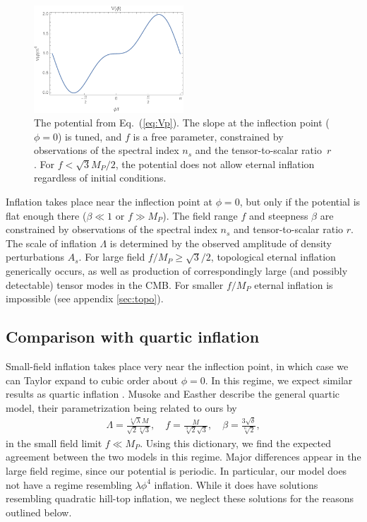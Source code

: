 \documentclass[aps,amsfonts,amsmath,prd,preprint,nofootinbib]{revtex4}
\newcommand{\Mp}{{M_{P}}}
\begin{document}
\begin{figure}[!h]
  \centering
    \includegraphics[width=0.5\textwidth]{figures/V.pdf}
    \caption{The potential from Eq.~(\ref{eq:Vp}).  The slope at the inflection point ($\phi = 0$) is tuned, and $f$ is a free parameter, constrained by 
    observations of the spectral index $n_s$ and the tensor-to-scalar ratio~$r$.  For $f < \sqrt{3}\Mp/2$, the potential does not allow eternal inflation regardless of initial conditions.}
\end{figure}


Inflation takes place near the inflection point at $\phi = 0$, but only if the potential is flat enough there ($\beta \ll 1$ or $f \gg \Mp$).
The field range $f$ and steepness $\beta$ are constrained by observations of the spectral index $n_s$ and tensor-to-scalar 
ratio $r$.   The scale of inflation $\Lambda$ is determined by the observed amplitude of density perturbations $A_s$.
 For large field $f/\Mp \geq \sqrt{3}/2$, topological eternal inflation generically occurs, as well as production of correspondingly large (and possibly detectable) tensor modes in the CMB.   
 For smaller $f/\Mp$ eternal inflation is impossible (see appendix \ref{sec:topo}).



\subsection{Comparison with quartic inflation}
Small-field inflation takes place very near the inflection point, in which case we can Taylor expand to cubic order about $\phi=0$. 
In this regime, we expect similar results as quartic inflation \cite{quartic}.  Musoke and Easther \cite{Musoke:2017frr} describe the general quartic model, their parametrization being related to ours by
\begin{align}
\Lambda = \frac{\sqrt[4]{\lambda } M}{\sqrt{2} \sqrt[4]{3}}, \quad f = \frac{M}{\sqrt[3]{2} \sqrt{3}}, \quad \beta = \frac{3 \sqrt{\delta}}{\sqrt[6]{2}},
\end{align}
in the small field limit $f \ll \Mp$.  Using this dictionary, we find the expected agreement between the two models in this regime.
Major differences appear in the large field regime, since our potential is periodic.  In particular, our model does not have a regime resembling $\lambda \phi^4$ inflation.  While it does
have solutions resembling quadratic hill-top inflation, we neglect these solutions for the reasons outlined below.
\end{document}
